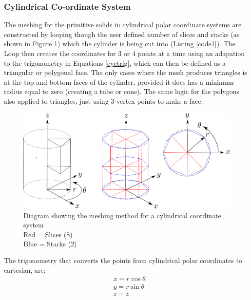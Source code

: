 \documentclass[12pt,a4paper]{article}
\begin{document}
\subsubsection{Cylindrical Co-ordinate System}
\label{cycl}
The meshing for the primitive solids in cylindrical polar coordinate systems are constructed by looping though the user defined number of slices and stacks (as shown in Figure \ref{cylmeshin}) which the cylinder is being cut into (Listing \ref{code1}). The Loop then creates the coordinates for 3 or 4 points at a time using an adapation to the trigonometry in Equations \ref{cyctrig}, which can then be defined as a triangular or polygonal face. The only cases where the mesh produces triangles is at the top and bottom faces of the cylinder, provided it does has a minimum radius equal to zero (creating a tube or cone). The same logic for the polygons also applied to triangles, just using 3 vertex points to make a face.

\begin{figure}[h!]
\centering
\includegraphics[scale=0.45]{Images//Coords//cyl.png}
\caption[width=\columnwidth]{Diagram showing the meshing method for a cylindrical coordinate system\\
Red = Slices   (8)\\
Blue = Stacks (2)}
\label{cylmeshin}
\end{figure}
\vspace{0.3cm}
The trigonometry that converts the points from cylindrical polar coordinates to cartesian, are:
\begin{equation}
\begin{aligned}
\label{cyctrig}
& x = r \cos{\theta} \\
& y = r \sin{\theta} \\
& z = z
\end{aligned}
\end{equation}
\end{document}
